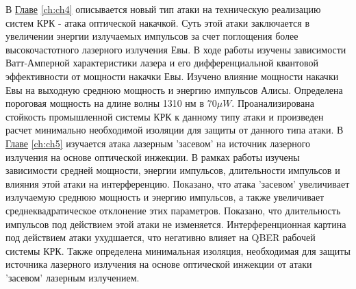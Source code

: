 \newline В \underline{Главе} \ref{ch:ch4} описывается новый тип атаки на техническую реализацию систем КРК - атака оптической накачкой. Суть этой атаки заключается в увеличении энергии излучаемых импульсов за счет поглощения более высокочастотного лазерного излучения Евы. 
В ходе работы изучены зависимости Ватт-Амперной характеристики лазера и его дифференциальной квантовой эффективности от мощности накачки Евы. Изучено влияние мощности накачки Евы на выходную среднюю мощность и энергию импульсов Алисы. Определена пороговая мощность на длине волны 1310 нм в $70\mu W$. Проанализирована стойкость промышленной системы КРК к данному типу атаки и произведен расчет минимально необходимой изоляции для защиты от данного типа атаки.
\newline В \underline{Главе} \ref{ch:ch5} изучается атака лазерным 'засевом' на источник лазерного излучения на основе оптической инжекции. В рамках работы изучены зависимости средней мощности, энергии импульсов, длительности импульсов и влияния этой атаки на интерференцию. Показано, что атака 'засевом' увеличивает излучаемую среднюю мощность и энергию импульсов, а также увеличивает среднеквадратическое отклонение этих параметров. 
Показано, что длительность импульсов под действием этой атаки не изменяется. Интерференционная картина под действием атаки ухудшается, что негативно влияет на QBER рабочей системы КРК. Также определена минимальная изоляция, необходимая для защиты источника лазерного излучения на основе оптической инжекции от атаки 'засевом' лазерным излучением.


